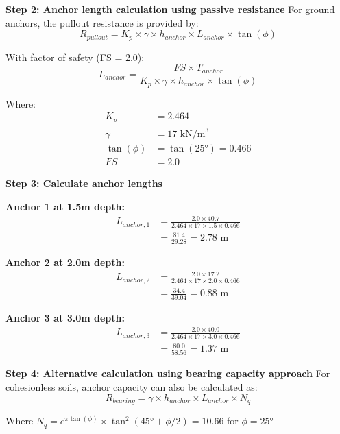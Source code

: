 \documentclass[10pt,a4paper,twocolumn]{article}
\begin{document}
\textbf{Step 2: Anchor length calculation using passive resistance}
For ground anchors, the pullout resistance is provided by:
\begin{equation}
R_{pullout} = K_p \times \gamma \times h_{anchor} \times L_{anchor} \times \tan(\phi)
\end{equation}

With factor of safety (FS = 2.0):
\begin{equation}
L_{anchor} = \frac{FS \times T_{anchor}}{K_p \times \gamma \times h_{anchor} \times \tan(\phi)}
\end{equation}

Where:
\begin{align}
K_p &= 2.464 \\
\gamma &= 17 \text{ kN/m}^3 \\
\tan(\phi) &= \tan(25°) = 0.466 \\
FS &= 2.0
\end{align}

\textbf{Step 3: Calculate anchor lengths}

\textbf{Anchor 1 at 1.5m depth:}
\begin{align}
L_{anchor,1} &= \frac{2.0 \times 40.7}{2.464 \times 17 \times 1.5 \times 0.466} \\
&= \frac{81.4}{29.28} = 2.78 \text{ m}
\end{align}

\textbf{Anchor 2 at 2.0m depth:}
\begin{align}
L_{anchor,2} &= \frac{2.0 \times 17.2}{2.464 \times 17 \times 2.0 \times 0.466} \\
&= \frac{34.4}{39.04} = 0.88 \text{ m}
\end{align}

\textbf{Anchor 3 at 3.0m depth:}
\begin{align}
L_{anchor,3} &= \frac{2.0 \times 40.0}{2.464 \times 17 \times 3.0 \times 0.466} \\
&= \frac{80.0}{58.56} = 1.37 \text{ m}
\end{align}

\textbf{Step 4: Alternative calculation using bearing capacity approach}
For cohesionless soils, anchor capacity can also be calculated as:
\begin{equation}
R_{bearing} = \gamma \times h_{anchor} \times L_{anchor} \times N_q
\end{equation}

Where $N_q = e^{\pi \tan(\phi)} \times \tan^2(45° + \phi/2) = 10.66$ for $\phi = 25°$
\end{document}
